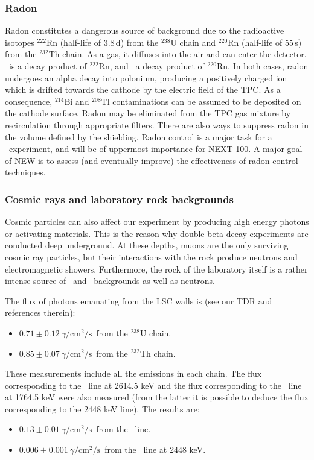 \subsubsection*{Radon}
Radon constitutes a dangerous source of background due to the radioactive isotopes $^{222}$Rn (half-life of 3.8\,d) from the $^{238}$U chain and $^{220}$Rn (half-life of 55\,s) from the $^{232}$Th chain. As a gas, it diffuses into the air and can enter the detector. \BI\ is a decay product of $^{222}$Rn, and \TL\ a decay product of $^{220}$Rn. In both cases, radon undergoes an alpha decay into polonium, producing a positively charged ion which is drifted towards the cathode by the electric field of the TPC.  As a consequence, $^{214}$Bi and $^{208}$Tl contaminations can be assumed to be deposited on the cathode surface. Radon may be eliminated from the TPC gas mixture by recirculation through appropriate filters. There are also ways to suppress radon in the volume defined by the shielding. Radon control is a major task for a \bbonu\ experiment, and will be of uppermost importance for NEXT-100. A major goal of NEW is to assess (and eventually improve) the effectiveness of radon control techniques. 

\subsubsection*{Cosmic rays and laboratory rock backgrounds}
Cosmic particles can also affect our experiment by producing high energy photons or activating materials. This is the reason why double beta decay experiments are conducted deep underground. At these depths, muons are the only surviving cosmic ray particles, but 
their interactions with the rock produce neutrons and electromagnetic showers. Furthermore, the rock of the laboratory itself is a rather intense source of \TL\ and \BI\ backgrounds as well as neutrons.

The flux of photons emanating from the LSC walls is (see our TDR and references therein):
\begin{itemize}
\item $0.71 \pm 0.12~{\gamma/\mathrm{cm}^2/\mathrm{s}}$~from the  $^{238}$U chain.
\item $0.85 \pm 0.07~{\gamma/\mathrm{cm}^2/\mathrm{s}}$~from the $^{232}$Th chain.
\end{itemize}

These measurements include all the emissions in each chain. The flux corresponding to the \TL\ line at 2614.5 keV and the flux corresponding to the \BI\ line at 1764.5 keV were also measured (from the latter it is possible to deduce the flux corresponding to the 2448 keV line). The results are:
\begin{itemize}
\item $0.13 \pm 0.01~{\gamma/\mathrm{cm}^2/\mathrm{s}}$~from the \TL\ line.
\item $0.006 \pm 0.001~{\gamma/\mathrm{cm}^2/\mathrm{s}}$~from the \BI\ line at 2448 keV. 
\end{itemize}

